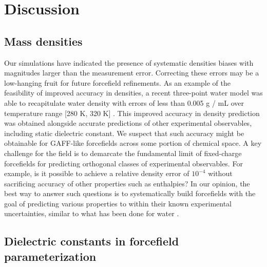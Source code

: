 \documentclass[aps,pre,twocolumn,nofootinbib,superscriptaddress,linenumbers]{revtex4-1}
\begin{document}

\section{Discussion}

\subsection{Mass densities}

Our simulations have indicated the presence of systematic densities biases with magnitudes larger than the measurement error.  
Correcting these errors may be a low-hanging fruit for future forcefield refinements.
As an example of the feasibility of improved accuracy in densities, a recent three-point water model was able to recapitulate water density with errors of less than 0.005 g / mL over temperature range [280 K, 320 K] \cite{wang2014building}.
This improved accuracy in density prediction was obtained alongside accurate predictions of other experimental observables, including static dielectric constant.  
We suspect that such accuracy might be obtainable for GAFF-like forcefields across some portion of chemical space.  
A key challenge for the field is to demarcate the fundamental limit of fixed-charge forcefields for predicting orthogonal classes of experimental observables.
For example, is it possible to achieve a relative density error of $10^{-4}$ without sacrificing accuracy of other properties such as enthalpies?
In our opinion, the best way to answer such questions is to systematically build forcefields with the goal of predicting various properties to within their known experimental uncertainties, similar to what has been done for water \cite{horn2004, wang2014building}.



\subsection{Dielectric constants in forcefield parameterization}
\end{document}

